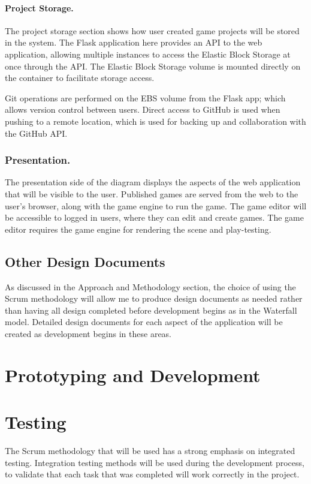 \documentclass[a4paper, 12pt]{article}
\begin{document}
\paragraph{Project Storage.}
The project storage section shows how user created game projects will be stored in the system. The Flask application here provides an API to the web application, allowing multiple instances to access the Elastic Block Storage at once through the API. The Elastic Block Storage volume is mounted directly on the container to facilitate storage access.

Git operations are performed on the EBS volume from the Flask app; which allows version control between users. Direct access to GitHub is used when pushing to a remote location, which is used for backing up and collaboration with the GitHub API.

\subsubsection{Presentation.}
The presentation side of the diagram displays the aspects of the web application that will be visible to the user. Published games are served from the web to the user's browser, along with the game engine to run the game. The game editor will be accessible to logged in users, where they can edit and create games. The game editor requires the game engine for rendering the scene and play-testing.

\subsection{Other Design Documents}
As discussed in the Approach and Methodology section, the choice of using the Scrum methodology will allow me to produce design documents as needed rather than having all design completed before development begins as in the Waterfall model. Detailed design documents for each aspect of the application will be created as development begins in these areas.

\section{Prototyping and Development}


\section{Testing}
The Scrum methodology that will be used has a strong emphasis on integrated testing. Integration testing methods will be used during the development process, to validate that each task that was completed will work correctly in the project.
\end{document}

